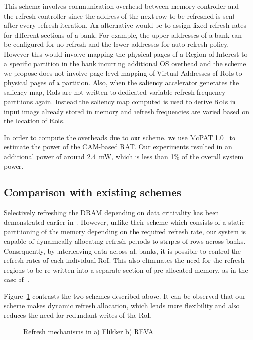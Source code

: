 This scheme involves communication overhead between memory controller and the refresh controller since the address of the next row to be refreshed is sent after every refresh iteration. An alternative would be to assign fixed refresh rates for different sections of a bank. For example, the upper addresses of a bank can be configured for no refresh and the lower addresses for auto-refresh policy. However this would involve mapping the physical pages of a Region of Interest to a specific partition in the bank incurring additional OS overhead and the scheme we propose does not involve page-level mapping of Virtual Addresses of RoIs to physical pages of a partition. Also, when the saliency accelerator generates the saliency map, RoIs are not written to dedicated variable refresh frequency partitions again. Instead the saliency map computed is used to derive RoIs in input image already stored in memory and refresh frequencies are varied based on the location of RoIs. 

In order to compute the overheads due to our scheme, we use McPAT 1.0~\cite{mcpat} to estimate the power of the CAM-based RAT. Our experiments resulted in an additional power of around 2.4~mW, which is less than 1\% of the overall system power. 

\subsection{Comparison with existing schemes}
Selectively refreshing the DRAM depending on data criticality has been demonstrated earlier in~\cite{Liu2011}. However, unlike their scheme which consists of a static partitioning of the memory depending on the required refresh rate, our system is capable of dynamically allocating refresh periods to stripes of rows across banks. Consequently, by interleaving data across all banks, it is possible to control the refresh rates of each individual RoI. 
This also eliminates the need for the refresh regions to be re-written into a separate section of pre-allocated memory, as in the case of~\cite{Liu2011}.

Figure~\ref{fig:reva-refresh} contrasts the two schemes described above. It can be observed that our scheme makes dynamic refresh allocation, which lends more flexibility and also reduces the need for redundant writes of the RoI.

\begin{figure}[ht!]
\centering
{}
\caption{\label{fig:reva-refresh} Refresh mechanisms in a) Flikker  b) REVA}
\vspace{-0.2in}
\end{figure}
